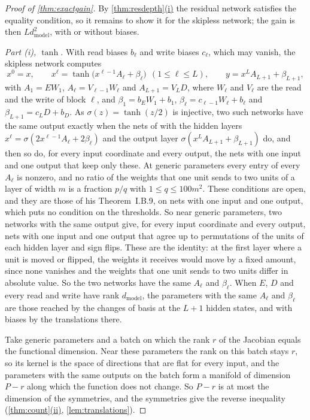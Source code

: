 \documentclass[10pt]{article}
\theoremstyle{definition}
\theoremstyle{remark}
\newcommand{\dm}{d_{\mathrm{model}}}
\DeclareRobustCommand{\cpref}[2]{\hyperref[#1:#2]{\cref*{#1}(#2)}}
\begin{document}
\begin{proof}[Proof of \cref{thm:exactgain}]
By \cpref{thm:resdepth}{i} the residual network satisfies the equality condition, so it remains to show it for the skipless network; the gain is then $L\dm^2$, with or without biases.

\emph{Part (i), $\tanh$.} With read biases $b_\ell$ and write biases $c_\ell$, which may vanish, the skipless network computes
\[
x^0 = x,\qquad x^\ell = \tanh\big(x^{\ell-1}A_\ell + \beta_\ell\big)\ \ (1 \le \ell \le L),\qquad y = x^LA_{L+1} + \beta_{L+1},
\]
with $A_1 = EW_1$, $A_\ell = V_{\ell-1}W_\ell$ and $A_{L+1} = V_LD$, where $W_\ell$ and $V_\ell$ are the read and the write of block $\ell$, and $\beta_1 = b_EW_1 + b_1$, $\beta_\ell = c_{\ell-1}W_\ell + b_\ell$ and $\beta_{L+1} = c_LD + b_D$. As $\sigma(z) = \tanh(z/2)$ is injective, two such networks have the same output exactly when the nets of \citet{fefferman1994} with the hidden layers $x^\ell = \sigma(2x^{\ell-1}A_\ell + 2\beta_\ell)$ and the output layer $\sigma(x^LA_{L+1} + \beta_{L+1})$ do, and then so do, for every input coordinate and every output, the nets with one input and one output that keep only these. At generic parameters every entry of every $A_\ell$ is nonzero, and no ratio of the weights that one unit sends to two units of a layer of width $m$ is a fraction $p/q$ with $1 \le q \le 100m^2$. These conditions are open, and they are those of his Theorem~I.B.9, on nets with one input and one output, which puts no condition on the thresholds. So near generic parameters, two networks with the same output give, for every input coordinate and every output, nets with one input and one output that agree up to permutations of the units of each hidden layer and sign flips. These are the identity: at the first layer where a unit is moved or flipped, the weights it receives would move by a fixed amount, since none vanishes and the weights that one unit sends to two units differ in absolute value. So the two networks have the same $A_\ell$ and $\beta_\ell$. When $E$, $D$ and every read and write have rank $\dm$, the parameters with the same $A_\ell$ and $\beta_\ell$ are those reached by the changes of basis at the $L+1$ hidden states, and with biases by the translations there.

Take generic parameters and a batch on which the rank $r$ of the Jacobian equals the functional dimension. Near these parameters the rank on this batch stays $r$, so its kernel is the space of directions that are flat for every input, and the parameters with the same outputs on the batch form a manifold of dimension $P - r$ along which the function does not change. So $P - r$ is at most the dimension of the symmetries, and the symmetries give the reverse inequality (\cpref{thm:count}{ii}, \cref{lem:translations}).


\end{proof}
\end{document}
